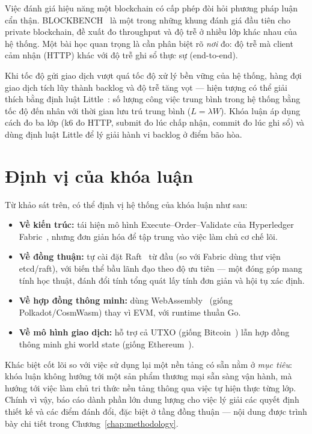 Việc đánh giá hiệu năng một blockchain có cấp phép đòi hỏi phương pháp luận cẩn
thận. BLOCKBENCH~\cite{dinh2017blockbench} là một trong những khung đánh giá đầu
tiên cho private blockchain, đề xuất đo throughput và độ trễ ở nhiều lớp khác
nhau của hệ thống. Một bài học quan trọng là cần phân biệt rõ \textit{nơi} đo:
độ trễ mà client cảm nhận (HTTP) khác với độ trễ ghi sổ thực sự (end-to-end).

Khi tốc độ gửi giao dịch vượt quá tốc độ xử lý bền vững của hệ thống, hàng đợi
giao dịch tích lũy thành backlog và độ trễ tăng vọt --- hiện tượng có
thể giải thích bằng định luật Little~\cite{little1961law}: số lượng
công việc trung bình trong hệ thống bằng tốc độ đến nhân với thời gian lưu trú
trung bình ($L = \lambda W$). Khóa luận áp dụng cách đo ba lớp (k6 đo HTTP,
submit đo lúc chấp nhận, commit đo lúc ghi sổ) và dùng định luật Little để lý
giải hành vi backlog ở điểm bão hòa.

\section{Định vị của khóa luận}
\label{sec:positioning}

Từ khảo sát trên, có thể định vị hệ thống của khóa luận như sau:

\begin{itemize}
  \item \textbf{Về kiến trúc:} tái hiện mô hình Execute--Order--Validate của
  Hyperledger Fabric~\cite{androulaki2018hyperledger}, nhưng đơn giản hóa để tập
  trung vào việc làm chủ cơ chế lõi.
  \item \textbf{Về đồng thuận:} tự cài đặt Raft~\cite{ongaro2014raft} từ đầu (so
  với Fabric dùng thư viện etcd/raft), với biến thể bầu lãnh đạo theo độ ưu tiên
  --- một đóng góp mang tính học thuật, đánh đổi tính tổng quát lấy tính đơn
  giản và hội tụ xác định.
  \item \textbf{Về hợp đồng thông minh:} dùng WebAssembly~\cite{haas2017wasm}
  (giống Polkadot/CosmWasm) thay vì EVM, với runtime thuần Go.
  \item \textbf{Về mô hình giao dịch:} hỗ trợ cả UTXO (giống
  Bitcoin~\cite{nakamoto2008bitcoin}) lẫn hợp đồng thông minh ghi world state
  (giống Ethereum~\cite{buterin2014ethereum}).
\end{itemize}

Khác biệt cốt lõi so với việc sử dụng lại một nền tảng có sẵn nằm ở
\textit{mục tiêu}: khóa luận không hướng tới một sản phẩm thương mại sẵn sàng
vận hành, mà hướng tới việc làm chủ tri thức nền tảng thông qua việc tự
hiện thực từng lớp. Chính vì vậy, báo cáo dành phần lớn dung lượng cho việc lý
giải các quyết định thiết kế và các điểm đánh đổi, đặc biệt ở tầng đồng thuận ---
nội dung được trình bày chi tiết trong Chương~\ref{chap:methodology}.
